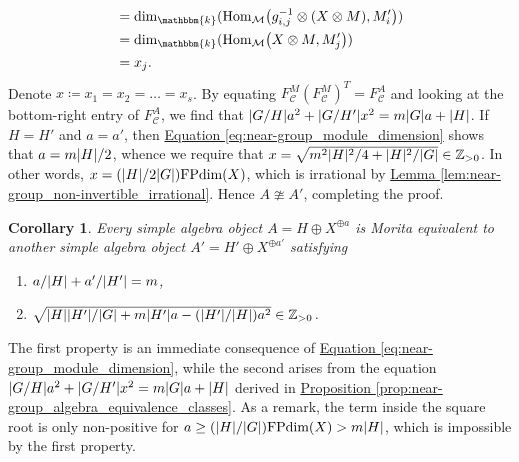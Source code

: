 \documentclass[12pt, reqno]{amsart}
\numberwithin{equation}{section}
\theoremstyle{plainspace}
\newtheorem{corollary}[theorem]{Corollary}
\theoremstyle{definitionspace}
\theoremstyle{remarkspace}
\renewenvironment{proof}{{\noindent\textbf{Proof.}}}{\null\hfill\qedsymbol}
\DeclarePairedDelimiter{\abs}{\lvert}{\rvert}
\newcommand{\mathcat}[1]{\mathcal{#1}}
\newcommand{\Hom}[2][]{
	\ifthenelse{\equal{#2}{}}
		{\textup{Hom}_{#1}}
		{\textup{Hom}_{#1}\!\left(#2\right)}
}
\newcommand{\FPdim}{\textup{FPdim}}
\begin{document}
\begin{proof}
\begin{align*}
\begin{split}
&= \dim_{\mathbbm{k}}(\Hom[\mathcat{M}]{g_{i,j}^{-1} \otimes (X \otimes M), M_i'}) \\
&= \dim_{\mathbbm{k}}(\Hom[\mathcat{M}]{X \otimes M, M_j'}) \\
&= x_j.
\end{split}
\end{align*}
\noindent Denote $x \coloneqq x_1 = x_2 = \dots = x_s$. By equating $F_{\mathcat{C}}^M(F_{\mathcat{C}}^M)^T = F_{\mathcat{C}}^A$ and looking at the bottom-right entry of $F_{\mathcat{C}}^A$, we find that $\abs{G/H}a^2 + \abs{G/H'}x^2 = m\abs{G}a + \abs{H}$. If $H = H'$ and $a = a'$, then \hyperref[eq:near-group_module_dimension]{Equation \ref*{eq:near-group_module_dimension}} shows that $a = m\abs{H}/2$, whence we require that $x = \sqrt{m^2\abs{H}^2/4 + \abs{H}^2/\abs{G}} \in \mathbb{Z}_{>0}$. In other words, $x = (\abs{H}/2\abs{G})\FPdim(X)$, which is irrational by \hyperref[lem:near-group_non-invertible_irrational]{Lemma \ref*{lem:near-group_non-invertible_irrational}}. Hence $A \ncong A'$, completing the proof.
\end{proof}
\newline

\begin{corollary}\label{cor:near-group_algebra_properties}
Every simple algebra object $A = H \oplus X^{\oplus a}$ is Morita equivalent to another simple algebra object $A' = H' \oplus X^{\oplus a'}$ satisfying
\begin{enumerate}[start=1, leftmargin=1.5cm, label={(\arabic*).}]
\item $a/\abs{H} + a'/\abs{H'} = m$,
\item $\sqrt{\abs{H}\abs{H'}/\abs{G} + m\abs{H'}a - (\abs{H'}/\abs{H})a^2} \in \mathbb{Z}_{>0}$.
\end{enumerate}

\end{corollary}
\leavevmode\newline
\begin{proof}
\noindent The first property is an immediate consequence of \hyperref[eq:near-group_module_dimension]{Equation \ref*{eq:near-group_module_dimension}}, while the second arises from the equation $\abs{G/H}a^2 + \abs{G/H'}x^2 = m\abs{G}a + \abs{H}$ derived in \hyperref[prop:near-group_algebra_equivalence_classes]{Proposition \ref*{prop:near-group_algebra_equivalence_classes}}. As a remark, the term inside the square root is only non-positive for $a \geq (\abs{H}/\abs{G})\FPdim(X) > m\abs{H}$, which is impossible by the first property.
\end{proof}
\newline
\end{document}
